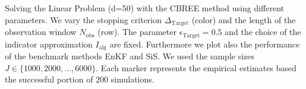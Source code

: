 Solving the Linear Problem (d=50) with the CBREE method using  different parameters. We vary the stopping criterion $\Delta_{\text{Target}}$ (color) and the length of the observation window $N_\text{obs}$ (row). The parameter $\epsilon_{\text{Target}} = 0.5$ and the choice of the indicator approximation $I_\text{alg}$ are fixed. Furthermore we plot also the performance of the benchmark methods EnKF and SiS. We used the sample sizes $J \in \{1000, 2000, \ldots, 6000\}$. Each marker represents the empirical estimates based the successful portion of $200$ simulations.
